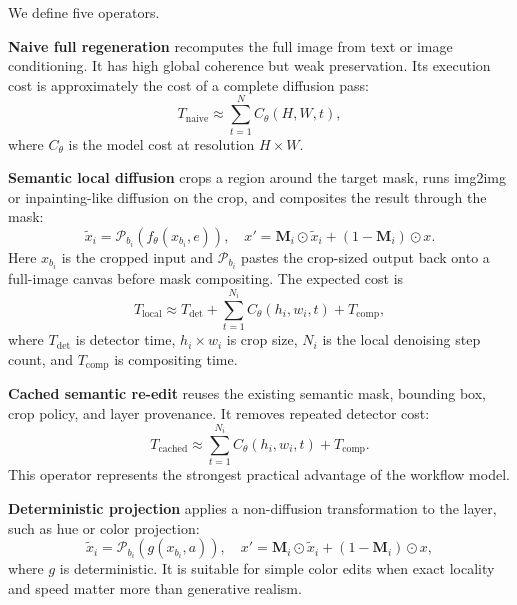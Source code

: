 \documentclass[final,5p,times,number,sort&compress]{elsarticle}
\newcommand{\mask}{\mathbf{M}}
\begin{document}
We define five operators.

\textbf{Naive full regeneration} recomputes the full image from text or image conditioning. It has high global coherence but weak preservation. Its execution cost is approximately the cost of a complete diffusion pass:
\begin{equation}
    T_{\mathrm{naive}} \approx \sum_{t=1}^{N} C_{\theta}(H,W,t),
\end{equation}
where \(C_{\theta}\) is the model cost at resolution \(H \times W\).

\textbf{Semantic local diffusion} crops a region around the target mask, runs img2img or inpainting-like diffusion on the crop, and composites the result through the mask:
\begin{equation}
    \tilde{x}_i = \mathcal{P}_{b_i}\!\left(f_{\theta}(x_{b_i}, e)\right),
    \quad
    x' = \mask_i \odot \tilde{x}_i + (1-\mask_i)\odot x.
\end{equation}
Here \(x_{b_i}\) is the cropped input and \(\mathcal{P}_{b_i}\) pastes the crop-sized output back onto a full-image canvas before mask compositing. The expected cost is
\begin{equation}
    T_{\mathrm{local}} \approx T_{\mathrm{det}} + \sum_{t=1}^{N_i} C_{\theta}(h_i,w_i,t) + T_{\mathrm{comp}},
\end{equation}
where \(T_{\mathrm{det}}\) is detector time, \(h_i \times w_i\) is crop size, \(N_i\) is the local denoising step count, and \(T_{\mathrm{comp}}\) is compositing time.

\textbf{Cached semantic re-edit} reuses the existing semantic mask, bounding box, crop policy, and layer provenance. It removes repeated detector cost:
\begin{equation}
    T_{\mathrm{cached}} \approx \sum_{t=1}^{N_i} C_{\theta}(h_i,w_i,t) + T_{\mathrm{comp}}.
\end{equation}
This operator represents the strongest practical advantage of the workflow model.

\textbf{Deterministic projection} applies a non-diffusion transformation to the layer, such as hue or color projection:
\begin{equation}
    \tilde{x}_i = \mathcal{P}_{b_i}\!\left(g(x_{b_i},a)\right),
    \quad
    x' = \mask_i \odot \tilde{x}_i + (1-\mask_i)\odot x,
\end{equation}
where \(g\) is deterministic. It is suitable for simple color edits when exact locality and speed matter more than generative realism.
\end{document}
